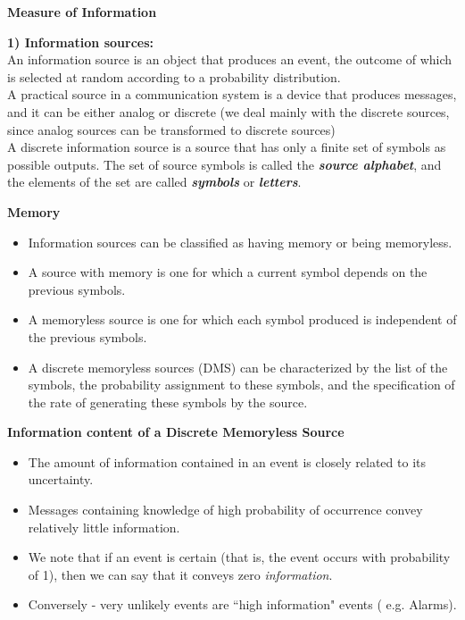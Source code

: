 \documentclass[a4]{beamer}
\begin{document}
\noindent \textbf{Measure of Information}

\textbf{1) Information sources:}\\

An information source is an object that produces an event, the outcome of which is selected at
random according to a probability distribution.  \\ \bigskip A practical source in a communication system is a
device that produces messages, and it can be either analog or discrete (we deal mainly
with the discrete sources, since analog sources can be transformed to discrete sources) \\ \bigskip A discrete information source is a
source that has only a finite set of symbols as possible outputs. The set of source symbols is called the
\textbf{\emph{source alphabet}}, and the elements of the set are called \textbf{\emph{ symbols}} or \textbf{\emph{letters}}.


\noindent \textbf{Memory}
\begin{itemize} \item Information sources can be classified as having memory or being memoryless.
\item A source with
memory is one for which a current symbol depends on the previous symbols.\item A memoryless source is
one for which each symbol produced is independent of the previous symbols.

\item A discrete memoryless sources (DMS) can be characterized by the list of the symbols, the
probability assignment to these symbols, and the specification of the rate of generating these symbols by the source.\end{itemize}



\noindent \textbf{Information content of a Discrete Memoryless Source}
\begin{itemize}
\item The amount of information contained in an event is closely related to its uncertainty.
\item Messages containing knowledge of high probability of occurrence convey relatively little information.

\item We note that if an event is certain (that is, the event occurs with probability of 1), then we can say that it conveys zero \textit{information}.

\item Conversely - very unlikely events are ``high information" events ( e.g. Alarms).
\end{itemize}
\end{document}
